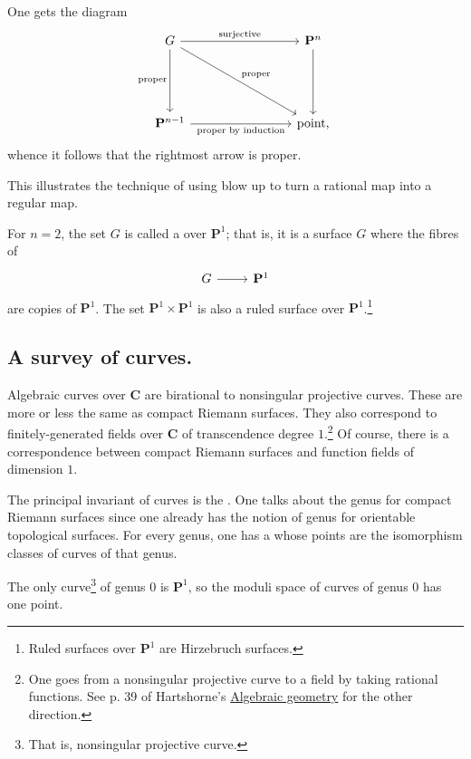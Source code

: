 \documentclass [11 pt, oneside] {article}
\begin{document}
One gets the diagram
\[
\begin{tikzcd}[column sep = 8 em, row sep = 5 em]
	G \ar[r, "\textrm{surjective}" \iffalse twoheadrightarrow\fi] \ar[d,swap,"\textrm{proper}"] \ar[dr, "\textrm{proper}"] & \mathbf{P}^n\ar[d]\\
	\mathbf{P}^{n-1}\ar[r,"\textrm{proper }\\ \textrm{by induction}", swap] &\textrm{point,}
\end{tikzcd}
\]
whence it follows that the rightmost arrow is proper.

\begin{remark}
	This illustrates the technique of using blow up to turn a rational map into a regular map.
\end{remark}

\begin{remark}
	For $n=2$, the set $G$ is called a  over $\mathbf{P}^1$; that is, it is a surface $G$ where the fibres of 
	\[
\begin{tikzcd}
G\ar[r]& \mathbf{P}^1
\end{tikzcd}
\]
	are copies of $\mathbf{P}^1$. The set $\mathbf{P}^1\times \mathbf{P}^1$ is also a ruled surface over $\mathbf{P}^1$.\footnote{Ruled surfaces over $\mathbf{P}^1$ are Hirzebruch surfaces.}
\end{remark}

\subsection{A survey of curves.}
Algebraic curves over $\mathbf{C}$ are birational to nonsingular projective curves. These are more or less the same as compact Riemann surfaces. They also correspond to finitely-generated fields over $\mathbf{C}$ of transcendence degree $1$.\footnote{One goes from a nonsingular projective curve to a field by taking rational functions. See p. 39 of Hartshorne's \ul{Algebraic geometry} for the other direction.} Of course, there is a correspondence between compact Riemann surfaces and function fields of dimension $1$.

The principal invariant of curves is the . One talks about the genus for compact Riemann surfaces since one already has the notion of genus for orientable topological surfaces. For every genus, one has a  whose points are the isomorphism classes of curves of that genus.

The only curve\footnote{That is, nonsingular projective curve.} of genus $0$ is $\mathbf{P}^1$, so the moduli space of curves of genus $0$ has one point.
\end{document}
